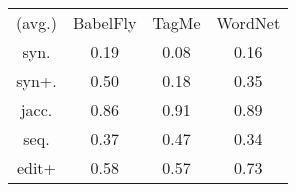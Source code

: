 \begin{tabular}{cccc}
(avg.) & BabelFly & TagMe & WordNet\\ 
syn. & 0.19 & 0.08 & 0.16\\ 
syn+. & 0.50 & 0.18 & 0.35\\ 
jacc. & 0.86 & 0.91 & 0.89\\ 
seq. & 0.37 & 0.47 & 0.34\\ 
edit+ & 0.58 & 0.57 & 0.73
\end{tabular}